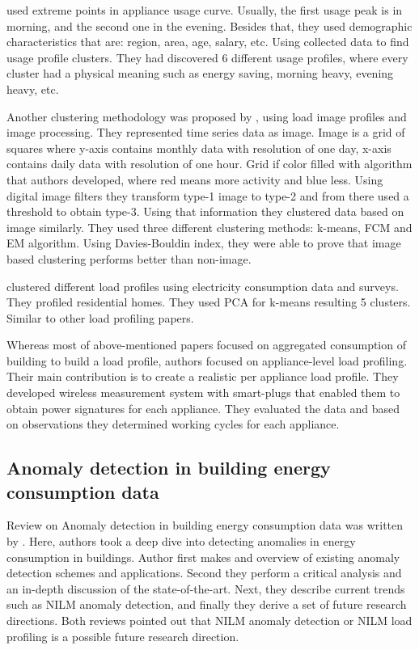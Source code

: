\documentclass[
11pt, %
english, %
singlespacing, %
headsepline, %
]{MastersDoctoralThesis} %
\begin{document}
\cite{Jeong2021} used extreme points in appliance usage curve.
Usually, the first usage peak is in morning, and the second one in the evening. 
Besides that, they used demographic characteristics that are: region, area, age, salary, etc. 
Using collected data to find usage profile clusters. They had discovered  6 different usage profiles, 
where every cluster had a physical meaning such as energy saving, morning heavy, evening heavy, etc.

Another clustering methodology was proposed by \cite{Park2019}, using load image profiles and image processing.
They represented time series data as image. Image is a grid of squares where y-axis contains monthly data with resolution of one day,
x-axis contains daily data with resolution of one hour. Grid if color filled with algorithm that authors developed,
where red means more activity and blue less. Using digital image filters they transform type-1 image to type-2 and from there
used a threshold to obtain type-3. Using that information they clustered data based on image similarly. They used three different 
clustering methods: k-means, FCM and EM algorithm. Using Davies-Bouldin index, they were able to prove that image based clustering performs better than non-image.

\cite{Joana2012} clustered different load profiles using electricity consumption data and surveys. They profiled residential homes. 
They used PCA for k-means resulting 5 clusters. Similar to other load profiling papers. 

Whereas most of above-mentioned papers focused on aggregated consumption of building to build a load profile,
authors \cite{Issi2018} focused on appliance-level load profiling.
Their main contribution is to create a realistic per appliance load profile.
They developed wireless measurement system with smart-plugs that enabled them to obtain 
power signatures for each appliance. They evaluated the data and based on observations they determined working cycles for each appliance.

\subsection{Anomaly detection in building energy consumption data}

Review on Anomaly detection in building energy consumption data was written by \cite{HIMEUR2021116601}.
Here, authors took a deep dive into detecting anomalies in energy consumption in buildings. 
Author first makes and overview of existing anomaly detection schemes and applications.
Second they perform a critical analysis and an in-depth discussion of the state-of-the-art.
Next, they describe current trends such as NILM anomaly detection, and finally they derive a set of future research directions. 
Both reviews pointed out that NILM anomaly detection or NILM load profiling is a possible future research direction.
\end{document}
